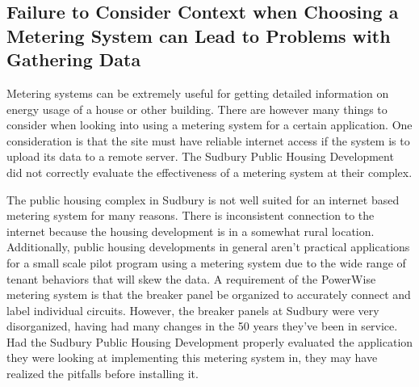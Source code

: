\subsection{Failure to Consider Context when Choosing a Metering System can Lead to Problems with Gathering Data}
\par Metering systems can be extremely useful for getting detailed information on energy usage of a house or other building. There are however many things to consider when looking into using a metering system for a certain application. One consideration is that the site must have reliable internet access if the system is to upload its data to a remote server. The Sudbury Public Housing Development did not correctly evaluate the effectiveness of a metering system at their complex.
\par The public housing complex in Sudbury is not well suited for an internet based metering system for many reasons. There is inconsistent connection to the internet because the housing development is in a somewhat rural location. Additionally, public housing developments in general aren’t practical applications for a small scale pilot program using a metering system due to the wide range of tenant behaviors that will skew the data. A requirement of the PowerWise metering system is that the breaker panel be organized to accurately connect and label individual circuits. However, the breaker panels at Sudbury were very disorganized, having had many changes in the 50 years they’ve been in service. Had the Sudbury Public Housing Development properly evaluated the application they were looking at implementing this metering system in, they may have realized the pitfalls before installing it.